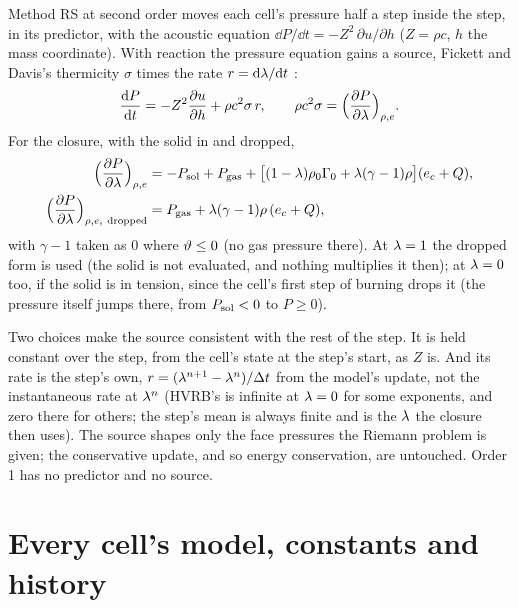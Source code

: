 Method RS at second order moves each cell's pressure half a step inside the
step, in its predictor, with the acoustic equation $\dd P/\dd t =
-Z^2\,\partial u/\partial h$ ($Z = \rho c$, $h$ the mass coordinate). With
reaction the pressure equation gains a source, Fickett and Davis's
thermicity $\sigma$ times the rate $r = \mathrm{d}\lambda/\mathrm{d} t$
\cite{fickett1979,kittell2020pep}:
\begin{equation}
  \frac{\mathrm{d} P}{\mathrm{d} t} = -Z^2\frac{\partial u}{\partial h} + \rho c^2\sigma\, r,
  \qquad
  \rho c^2\sigma = \Bigl(\frac{\partial P}{\partial\lambda}\Bigr)_{\rho, e}.
  \label{eq:rs-source}
\end{equation}
For the closure, with the solid in and dropped,
\begin{align}
  \Bigl(\frac{\partial P}{\partial\lam}\Bigr)_{\rho,e}
  &= -\Ps + \Pg + \bigl[(1 - \lam)\rhoz\Gz + \lam(\gamma - 1)\rho\bigr](e_c + Q),
  \label{eq:dpdlam}\\
  \Bigl(\frac{\partial P}{\partial\lam}\Bigr)_{\rho,e,\ \mathrm{dropped}}
  &= \Pg + \lam(\gamma - 1)\rho\,(e_c + Q),
  \label{eq:dpdlam-dropped}
\end{align}
with $\gamma - 1$ taken as 0 where $\vartheta \le 0$ (no gas pressure there). At
$\lambda = 1$ the dropped form is used (the solid is not evaluated, and nothing
multiplies it then); at $\lambda = 0$ too, if the solid is in tension, since
the cell's first step of burning drops it (the pressure itself jumps there,
from $P_{\mathrm{sol}} < 0$ to $P \ge 0$).

Two choices make the source consistent with the rest of the step. It is held
constant over the step, from the cell's state at the step's start, as $Z$ is.
And its rate is the step's own, $r = (\lambda^{n+1} - \lambda^{n})/\Delta t$ from
the model's update, not the instantaneous rate at $\lambda^n$ (HVRB's is
infinite at $\lambda = 0$ for some exponents, and zero there for others; the
step's mean is always finite and is the $\lambda$ the closure then uses). The
source shapes only the face pressures the Riemann problem is given; the
conservative update, and so energy conservation, are untouched. Order 1 has
no predictor and no source.

\section{Every cell's model, constants and history}
\label{sec:burn-table}

